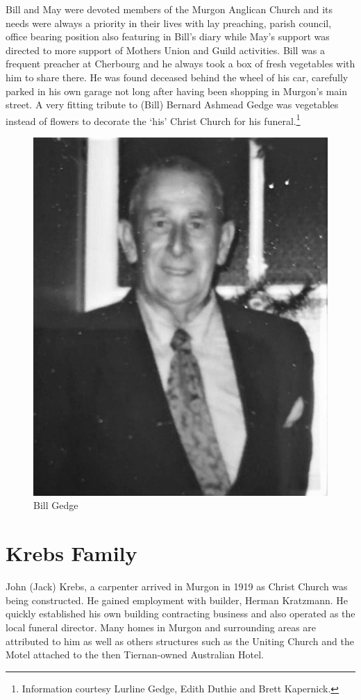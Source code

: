 Bill and May were devoted members of the Murgon Anglican Church and its needs were always a priority in their lives with lay preaching, parish council, office bearing position also featuring in Bill's diary while May's support was directed to more support of Mothers Union and Guild activities. Bill was a frequent preacher at Cherbourg and he always took a box of fresh vegetables with him to share there. He was found deceased behind the wheel of his car, carefully parked in his own garage not long after having been shopping in Murgon's main street. A very fitting tribute to (Bill) Bernard Ashmead Gedge was vegetables instead of flowers to decorate the `his' Christ Church for his funeral.\footnote{Information courtesy Lurline Gedge, Edith Duthie and Brett Kapernick.}








\begin{figure}
\begin{center}
\includegraphics[width=.6\linewidth,center]{../images/BillGedge.jpg}
\caption{Bill Gedge}
\end{center}
\end{figure}




\section{Krebs Family}



John (Jack) Krebs, a carpenter arrived in Murgon in 1919 as Christ Church was being constructed. He gained employment with builder, Herman Kratzmann. He quickly established his own building contracting business and also operated as the local funeral director. Many homes in Murgon and surrounding areas are attributed to him as well as others structures such as the Uniting Church and the Motel attached to the then Tiernan-owned Australian Hotel.









